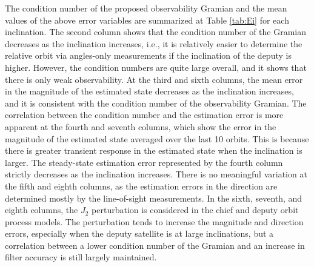 The condition number of the proposed observability Gramian and the mean values of the above error variables are summarized at Table \ref{tab:Ei} for each inclination. The second column shows that the condition number of the Gramian decreases as the inclination increases, i.e., it is relatively easier to determine the relative orbit via angles-only measurements if the inclination of the deputy is higher. However, the condition numbers are quite large overall, and it shows that there is only weak observability. At the third  and sixth columns, the mean error in the magnitude of the estimated state decreases as the inclination increases, and it is consistent with the condition number of the observability Gramian. The correlation between the condition number and the estimation error is more apparent at the fourth and seventh columns, which show the error in the magnitude of the estimated state averaged over the last 10 orbits. This is because there is greater transient response in the estimated state when the inclination is larger. The steady-state estimation error represented by the fourth column strictly decreases as the inclination increases. There is no meaningful variation at the fifth and eighth columns, as the estimation errors in the direction are determined mostly by the line-of-sight measurements. In the sixth, seventh, and eighth columns, the $J_2$ perturbation is considered in the chief and deputy orbit process models. The perturbation tends to increase the magnitude and direction errors, especially when the deputy satellite is at large inclinations, but a correlation between a lower condition number of the Gramian and an increase in filter accuracy is still largely maintained.


